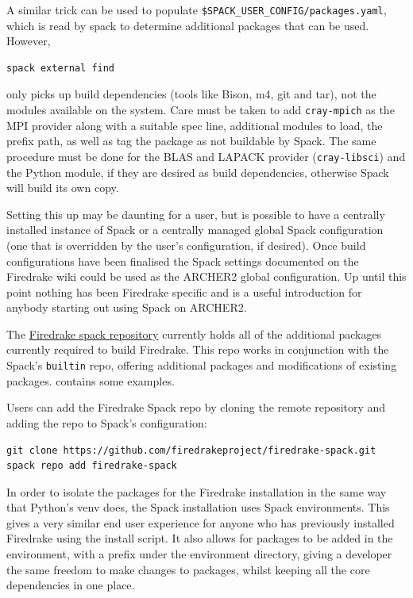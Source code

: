 \documentclass[a4paper,11pt]{article}
\begin{document}
A similar trick can be used to populate \verb`$SPACK_USER_CONFIG/packages.yaml`, which is read by spack to determine additional packages that can be used.
However,
\begin{lstlisting}[numbers=none]
spack external find	
\end{lstlisting}
only picks up build dependencies (tools like Bison, m4, git and tar), not the modules available on the system.
Care must be taken to add \verb`cray-mpich` as the MPI provider along with a suitable spec line, additional modules to load, the prefix path, as well as tag the package as not buildable by Spack.
The same procedure must be done for the BLAS and LAPACK provider (\verb`cray-libsci`) and the Python module, if they are desired as build dependencies, otherwise Spack will build its own copy.

Setting this up may be daunting for a user, but is possible to have a centrally installed instance of Spack or a centrally managed global Spack configuration (one that is overridden by the user's configuration, if desired).
Once build configurations have been finalised the Spack settings documented on the Firedrake wiki\cite{firedrakewiki} could be used as the ARCHER2 global configuration.
Up until this point nothing has been Firedrake specific and is a useful introduction for anybody starting out using Spack on ARCHER2.

The \href{https://github.com/firedrakeproject/firedrake-spack}{Firedrake spack repository} currently holds all of the additional packages currently required to build Firedrake.
This repo works in conjunction with the Spack's \verb`builtin` repo, offering additional packages and modifications of existing packages.
 contains some examples.

Users can add the Firedrake Spack repo by cloning the remote repository and adding the repo to Spack's configuration:
\begin{lstlisting}
git clone https://github.com/firedrakeproject/firedrake-spack.git
spack repo add firedrake-spack
\end{lstlisting}

In order to isolate the packages for the Firedrake installation in the same way that Python's venv does, the Spack installation uses Spack environments.
This gives a very similar end user experience for anyone who has previously installed Firedrake using the install script.
It also allows for packages to be added in the environment, with a prefix under the environment directory, giving a developer the same freedom to make changes to packages, whilst keeping all the core dependencies in one place.
\end{document}
